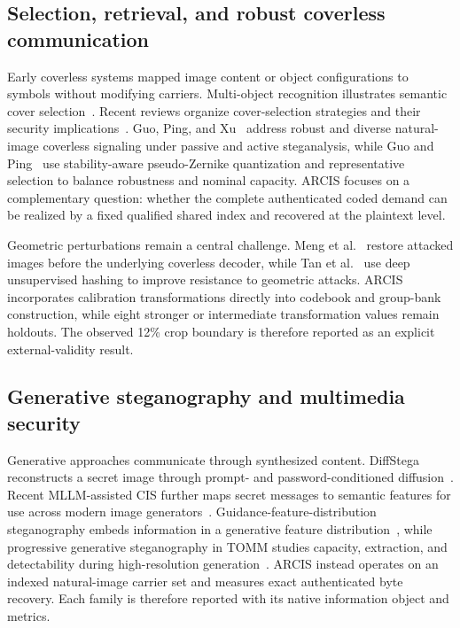 \documentclass[acmsmall,review,screen]{acmart}
\newcommand{\method}{ARCIS\xspace}
\begin{document}
\subsection{Selection, retrieval, and robust coverless communication}
Early coverless systems mapped image content or object configurations to symbols without modifying carriers. Multi-object recognition illustrates semantic cover selection~\cite{luo2021multiobject}. Recent reviews organize cover-selection strategies and their security implications~\cite{azam2025review,kombrink2025survey}. Guo, Ping, and Xu~\cite{guo2025active} address robust and diverse natural-image coverless signaling under passive and active steganalysis, while Guo and Ping~\cite{guo2026capacity} use stability-aware pseudo-Zernike quantization and representative selection to balance robustness and nominal capacity. \method focuses on a complementary question: whether the complete authenticated coded demand can be realized by a fixed qualified shared index and recovered at the plaintext level.

Geometric perturbations remain a central challenge. Meng et al.~\cite{meng2025restoration} restore attacked images before the underlying coverless decoder, while Tan et al.~\cite{tan2026hashing} use deep unsupervised hashing to improve resistance to geometric attacks. \method incorporates calibration transformations directly into codebook and group-bank construction, while eight stronger or intermediate transformation values remain holdouts. The observed 12\% crop boundary is therefore reported as an explicit external-validity result.

\subsection{Generative steganography and multimedia security}
Generative approaches communicate through synthesized content. DiffStega reconstructs a secret image through prompt- and password-conditioned diffusion~\cite{yang2024diffstega}. Recent MLLM-assisted CIS further maps secret messages to semantic features for use across modern image generators~\cite{li2026mllm}. Guidance-feature-distribution steganography embeds information in a generative feature distribution~\cite{sun2024guidance}, while progressive generative steganography in TOMM studies capacity, extraction, and detectability during high-resolution generation~\cite{zhou2025progressive}. \method instead operates on an indexed natural-image carrier set and measures exact authenticated byte recovery. Each family is therefore reported with its native information object and metrics.
\end{document}

